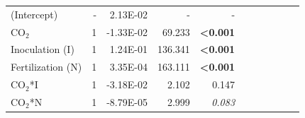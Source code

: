 \begin{landscape}
\begin{table}
{\begin{tabular}{p{3cm}p{0.5cm}p{1.75cm}p{1.5cm}p{1.5cm}p{1.75cm}p{1.5cm}p{1.5cm}p{1.75cm}p{1.5cm}p{1.5cm}}
            (Intercept) & \multicolumn{1}{r}{-}
            & \multicolumn{1}{r}{2.13E-02}  & \multicolumn{1}{r}{-}         & \multicolumn{1}{r}{-}
            & \multicolumn{1}{r}{}          & \multicolumn{1}{r}{}          & \multicolumn{1}{r}{}
            & \multicolumn{1}{r}{}          & \multicolumn{1}{r}{}          & \multicolumn{1}{r}{}
            \\

            CO$_2$ & \multicolumn{1}{r}{1}
            & \multicolumn{1}{r}{-1.33E-02} & \multicolumn{1}{r}{ 69.233}   & \multicolumn{1}{r}{\textbf{<0.001}}
            & \multicolumn{1}{r}{}          & \multicolumn{1}{r}{}          & \multicolumn{1}{r}{}
            & \multicolumn{1}{r}{}          & \multicolumn{1}{r}{}          & \multicolumn{1}{r}{} 
            \\


            Inoculation (I) & \multicolumn{1}{r}{1}
            & \multicolumn{1}{r}{1.24E-01}  & \multicolumn{1}{r}{136.341}   & \multicolumn{1}{r}{\textbf{<0.001}}
            & \multicolumn{1}{r}{}          & \multicolumn{1}{r}{}          & \multicolumn{1}{r}{}
            & \multicolumn{1}{r}{}          & \multicolumn{1}{r}{}          & \multicolumn{1}{r}{} 
            \\

            Fertilization (N) & \multicolumn{1}{r}{1}
            & \multicolumn{1}{r}{3.35E-04}  & \multicolumn{1}{r}{163.111}   & \multicolumn{1}{r}{\textbf{<0.001}}
            & \multicolumn{1}{r}{}          & \multicolumn{1}{r}{}          & \multicolumn{1}{r}{}
            & \multicolumn{1}{r}{}          & \multicolumn{1}{r}{}          & \multicolumn{1}{r}{} 
            \\

            CO$_2$*I & \multicolumn{1}{r}{1}
            & \multicolumn{1}{r}{-3.18E-02} & \multicolumn{1}{r}{  2.102}   & \multicolumn{1}{r}{0.147}
            & \multicolumn{1}{r}{}          & \multicolumn{1}{r}{}          & \multicolumn{1}{r}{}
            & \multicolumn{1}{r}{}          & \multicolumn{1}{r}{}          & \multicolumn{1}{r}{} 
            \\

            CO$_2$*N & \multicolumn{1}{r}{1}
            & \multicolumn{1}{r}{-8.79E-05} & \multicolumn{1}{r}{  2.999}   & \multicolumn{1}{r}{\textit{0.083}}
            & \multicolumn{1}{r}{}          & \multicolumn{1}{r}{}          & \multicolumn{1}{r}{}
            & \multicolumn{1}{r}{}          & \multicolumn{1}{r}{}          & \multicolumn{1}{r}{} 
            \\


\end{tabular}}
\end{table}
\end{landscape}
